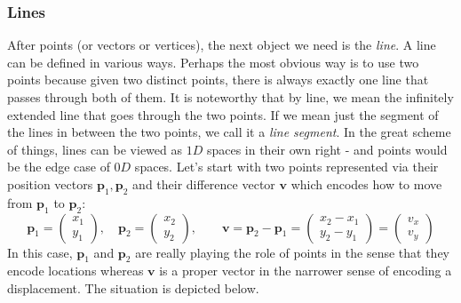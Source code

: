 \subsubsection{Lines}
After points (or vectors or vertices), the next object we need is the \emph{line}. A line can be defined in various ways. Perhaps the most obvious way is to use two points because given two distinct points, there is always exactly one line that passes through both of them. It is noteworthy that by line, we mean the infinitely extended line that goes through the two points. If we mean just the segment of the lines in between the two points, we call it a \emph{line segment}. In the great scheme of things, lines can be viewed as $1D$ spaces in their own right - and points would be the edge case of $0D$ spaces. Let's start with two points represented via their position vectors $\mathbf{p}_1, \mathbf{p}_2$ and their difference vector $\mathbf{v}$ which encodes how to move from $\mathbf{p}_1$ to $\mathbf{p}_2$:
\begin{equation}
\mathbf{p}_1 = \begin{pmatrix} x_1 \\ y_1 \end{pmatrix}, \quad
\mathbf{p}_2 = \begin{pmatrix} x_2 \\ y_2 \end{pmatrix}, \qquad
\mathbf{v}   = \mathbf{p}_2 - \mathbf{p}_1 
             = \begin{pmatrix} x_2 - x_1 \\ y_2 - y_1 \end{pmatrix}
             = \begin{pmatrix} v_x \\ v_y \end{pmatrix}
\end{equation}
In this case, $\mathbf{p}_1$ and $\mathbf{p}_2$ are really playing the role of points in the sense that they encode locations whereas $\mathbf{v}$ is a proper vector in the narrower sense of encoding a displacement. The situation is depicted below.

